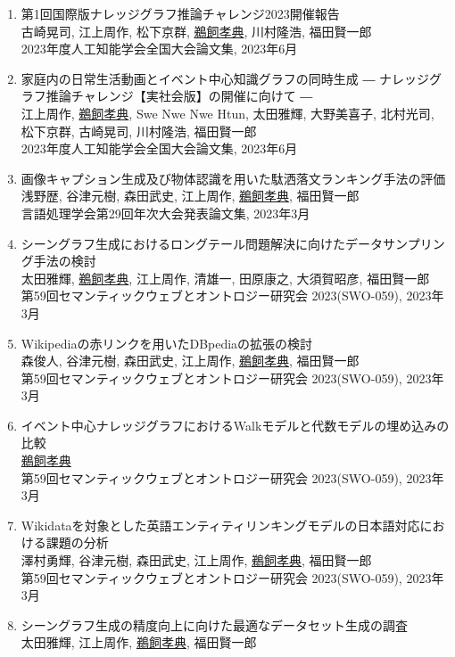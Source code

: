 \documentclass[dvipdfmx]{jlreq}
\begin{document}
\begin{enumerate}
\begin{enumerate}
\begin{enumerate}[label=\arabic*,align=right, labelsep=3pt]
2023年度人工知能学会全国大会論文集, 2023年6月
\item 第1回国際版ナレッジグラフ推論チャレンジ2023開催報告\\
古崎晃司, 江上周作, 松下京群, \underline{鵜飼孝典}, 川村隆浩, 福田賢一郎\\
2023年度人工知能学会全国大会論文集, 2023年6月
\item 家庭内の日常生活動画とイベント中心知識グラフの同時生成 ― ナレッジグラフ推論チャレンジ【実社会版】の開催に向けて ―\\
江上周作, \underline{鵜飼孝典}, Swe Nwe Nwe Htun, 太田雅輝, 大野美喜子, 北村光司, 松下京群, 古崎晃司, 川村隆浩, 福田賢一郎\\
2023年度人工知能学会全国大会論文集, 2023年6月
\item 画像キャプション生成及び物体認識を用いた駄洒落文ランキング手法の評価\\
浅野歴, 谷津元樹, 森田武史, 江上周作, \underline{鵜飼孝典}, 福田賢一郎\\
言語処理学会第29回年次大会発表論文集, 2023年3月
\item シーングラフ生成におけるロングテール問題解決に向けたデータサンプリング手法の検討\\
太田雅輝, \underline{鵜飼孝典}, 江上周作, 清雄一, 田原康之, 大須賀昭彦, 福田賢一郎\\
第59回セマンティックウェブとオントロジー研究会 2023(SWO-059), 2023年3月
\item Wikipediaの赤リンクを用いたDBpediaの拡張の検討\\
森俊人, 谷津元樹, 森田武史, 江上周作, \underline{鵜飼孝典}, 福田賢一郎\\
第59回セマンティックウェブとオントロジー研究会 2023(SWO-059), 2023年3月
\item イベント中心ナレッジグラフにおけるWalkモデルと代数モデルの埋め込みの比較\\
\underline{鵜飼孝典}\\
第59回セマンティックウェブとオントロジー研究会 2023(SWO-059), 2023年3月
\item Wikidataを対象とした英語エンティティリンキングモデルの日本語対応における課題の分析\\
澤村勇輝, 谷津元樹, 森田武史, 江上周作, \underline{鵜飼孝典}, 福田賢一郎\\
第59回セマンティックウェブとオントロジー研究会 2023(SWO-059), 2023年3月
\item シーングラフ生成の精度向上に向けた最適なデータセット生成の調査\\
太田雅輝, 江上周作, \underline{鵜飼孝典}, 福田賢一郎\\

\end{enumerate}
\end{enumerate}
\end{enumerate}
\end{document}
